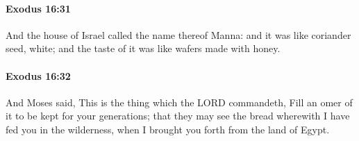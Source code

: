 		\paragraph{Exodus 16:31} %
			\label{EXODUS-16-31}

			And the house of Israel called the name thereof Manna: and it was like coriander seed, white; and the taste of it was like wafers made with honey.


		\paragraph{Exodus 16:32} %
			\label{EXODUS-16-32}

			And Moses said, This is the thing which the LORD commandeth, Fill an omer of it to be kept for your generations; that they may see the bread wherewith I have fed you in the wilderness, when I brought you forth from the land of Egypt.

